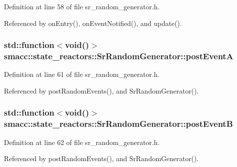 Definition at line 58 of file sr\+\_\+random\+\_\+generator.\+h.



Referenced by on\+Entry(), on\+Event\+Notified(), and update().

\subsubsection[{\texorpdfstring{post\+EventA}{postEventA}}]{\setlength{\rightskip}{0pt plus 5cm}std\+::function$<$void()$>$ smacc\+::state\+\_\+reactors\+::\+Sr\+Random\+Generator\+::post\+EventA\hspace{0.3cm}{\ttfamily [private]}}\hypertarget{classsmacc_1_1state__reactors_1_1SrRandomGenerator_ac157de4b848ebc5da1acb593f7b25108}{}\label{classsmacc_1_1state__reactors_1_1SrRandomGenerator_ac157de4b848ebc5da1acb593f7b25108}


Definition at line 61 of file sr\+\_\+random\+\_\+generator.\+h.



Referenced by post\+Random\+Events(), and Sr\+Random\+Generator().

\subsubsection[{\texorpdfstring{post\+EventB}{postEventB}}]{\setlength{\rightskip}{0pt plus 5cm}std\+::function$<$void()$>$ smacc\+::state\+\_\+reactors\+::\+Sr\+Random\+Generator\+::post\+EventB\hspace{0.3cm}{\ttfamily [private]}}\hypertarget{classsmacc_1_1state__reactors_1_1SrRandomGenerator_a0b38db23bf80e0709c2ae51c6a64ac1c}{}\label{classsmacc_1_1state__reactors_1_1SrRandomGenerator_a0b38db23bf80e0709c2ae51c6a64ac1c}


Definition at line 62 of file sr\+\_\+random\+\_\+generator.\+h.



Referenced by post\+Random\+Events(), and Sr\+Random\+Generator().


